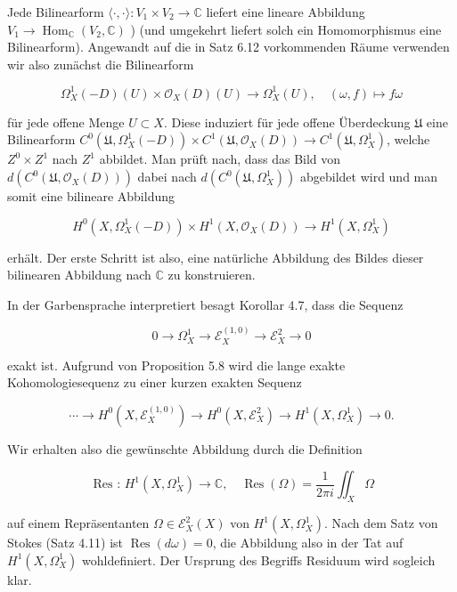 \documentclass[10pt, letterpaper]{article}
\begin{document}
Jede Bilinearform $\langle\cdot, \cdot\rangle: V_{1} \times V_{2} \rightarrow \mathbb{C}$ liefert eine lineare Abbildung $V_{1} \rightarrow \operatorname{Hom}_{\mathbb{C}}\left(V_{2}, \mathbb{C}\right)$ ) (und umgekehrt liefert solch ein Homomorphismus eine Bilinearform). Angewandt auf die in Satz 6.12 vorkommenden Räume verwenden wir also zunächst die Bilinearform

$$
\Omega_{X}^{1}(-D)(U) \times \mathcal{O}_{X}(D)(U) \rightarrow \Omega_{X}^{1}(U), \quad(\omega, f) \mapsto f \omega
$$

für jede offene Menge $U \subset X$. Diese induziert für jede offene Überdeckung $\mathfrak{U}$ eine Bilinearform $C^{0}\left(\mathfrak{U}, \Omega_{X}^{1}(-D)\right) \times C^{1}\left(\mathfrak{U}, \mathcal{O}_{X}(D)\right) \rightarrow C^{1}\left(\mathfrak{U}, \Omega_{X}^{1}\right)$, welche $Z^{0} \times Z^{1}$ nach $Z^{1}$ abbildet. Man prüft nach, dass das Bild von $d\left(C^{0}\left(\mathfrak{U}, \mathcal{O}_{X}(D)\right)\right)$ dabei nach $d\left(C^{0}\left(\mathfrak{U}, \Omega_{X}^{1}\right)\right)$ abgebildet wird und man somit eine bilineare Abbildung

$$
H^{0}\left(X, \Omega_{X}^{1}(-D)\right) \times H^{1}\left(X, \mathcal{O}_{X}(D)\right) \rightarrow H^{1}\left(X, \Omega_{X}^{1}\right)
$$

erhält. Der erste Schritt ist also, eine natürliche Abbildung des Bildes dieser bilinearen Abbildung nach $\mathbb{C}$ zu konstruieren.

In der Garbensprache interpretiert besagt Korollar 4.7, dass die Sequenz

$$
0 \rightarrow \Omega_{X}^{1} \rightarrow \mathcal{E}_{X}^{(1,0)} \rightarrow \mathcal{E}_{X}^{2} \rightarrow 0
$$

exakt ist. Aufgrund von Proposition 5.8 wird die lange exakte Kohomologiesequenz zu einer kurzen exakten Sequenz

$$
\cdots \rightarrow H^{0}\left(X, \mathcal{E}_{X}^{(1,0)}\right) \rightarrow H^{0}\left(X, \mathcal{E}_{X}^{2}\right) \rightarrow H^{1}\left(X, \Omega_{X}^{1}\right) \rightarrow 0 .
$$

Wir erhalten also die gewünschte Abbildung durch die Definition

$$
\text { Res : } H^{1}\left(X, \Omega_{X}^{1}\right) \rightarrow \mathbb{C}, \quad \operatorname{Res}(\Omega)=\frac{1}{2 \pi i} \iint_{X} \Omega
$$

auf einem Repräsentanten $\Omega \in \mathcal{E}_{X}^{2}(X)$ von $H^{1}\left(X, \Omega_{X}^{1}\right)$. Nach dem Satz von Stokes (Satz 4.11) ist $\operatorname{Res}(d \omega)=0$, die Abbildung also in der Tat auf $H^{1}\left(X, \Omega_{X}^{1}\right)$ wohldefiniert. Der Ursprung des Begriffs Residuum wird sogleich klar.
\end{document}
